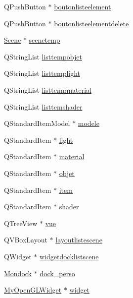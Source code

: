 \begin{DoxyCompactItemize}
Q\+Push\+Button $\ast$ \hyperlink{class_main_window_af87ab6bb1e48500cc732286cc98b990e}{boutonlisteelement}
\item 
Q\+Push\+Button $\ast$ \hyperlink{class_main_window_a0300f02a442c333e918e229817b27ef2}{boutonlisteelementdelete}
\item 
\hyperlink{class_scene}{Scene} $\ast$ \hyperlink{class_main_window_ab3b59f5d30eaedb1281da2b817c17fdf}{scenetemp}
\item 
Q\+String\+List \hyperlink{class_main_window_aefc66839b56eea01fa7b8b49ab5182a7}{listtempobjet}
\item 
Q\+String\+List \hyperlink{class_main_window_a2da91caa3f9e740cb7a50e110516212e}{listtemplight}
\item 
Q\+String\+List \hyperlink{class_main_window_a6eb445b9be6c49cf139c74b356ef7e58}{listtempmaterial}
\item 
Q\+String\+List \hyperlink{class_main_window_a889162c5299f284129bec68a0cc45cbf}{listtemshader}
\item 
Q\+Standard\+Item\+Model $\ast$ \hyperlink{class_main_window_abb752b382e336483740c8e0ad21cbcf5}{modele}
\item 
Q\+Standard\+Item $\ast$ \hyperlink{class_main_window_a36a5d988881c1ce38d0692ed500067e1}{light}
\item 
Q\+Standard\+Item $\ast$ \hyperlink{class_main_window_ad89e3c0f75025021cddb58c4cdd5edd8}{material}
\item 
Q\+Standard\+Item $\ast$ \hyperlink{class_main_window_ac76a7b94394a43600a0719ce4af388fc}{objet}
\item 
Q\+Standard\+Item $\ast$ \hyperlink{class_main_window_a4deb65af7d5cb84853c31faa114f0304}{item}
\item 
Q\+Standard\+Item $\ast$ \hyperlink{class_main_window_a8e49ee04eabb719ac4be13ba8cd3fe38}{shader}
\item 
Q\+Tree\+View $\ast$ \hyperlink{class_main_window_ac0150259862bd3b40a76b35a00b9e97a}{vue}
\item 
Q\+V\+Box\+Layout $\ast$ \hyperlink{class_main_window_ab25fb184d802450a71a998cf113d481a}{layoutlistescene}
\item 
Q\+Widget $\ast$ \hyperlink{class_main_window_a38d553a96a3898e65b500c639673b8de}{widgetdocklistscene}
\item 
\hyperlink{class_mondock}{Mondock} $\ast$ \hyperlink{class_main_window_a0733647a631eeb38fc72d3cf7e01c3db}{dock\+\_\+perso}
\item 
\hyperlink{class_my_open_g_l_widget}{My\+Open\+G\+L\+Widget} $\ast$ \hyperlink{class_main_window_a0a21ff789dee5a19a74d2461cf0820dc}{widget}
\end{DoxyCompactItemize}


